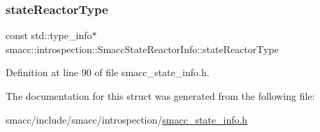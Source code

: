 \subsubsection{\texorpdfstring{state\+Reactor\+Type}{stateReactorType}}
{\footnotesize\ttfamily const std\+::type\+\_\+info$\ast$ smacc\+::introspection\+::\+Smacc\+State\+Reactor\+Info\+::state\+Reactor\+Type}



Definition at line 90 of file smacc\+\_\+state\+\_\+info.\+h.



The documentation for this struct was generated from the following file\+:\begin{DoxyCompactItemize}
\item 
smacc/include/smacc/introspection/\hyperlink{smacc__state__info_8h}{smacc\+\_\+state\+\_\+info.\+h}\end{DoxyCompactItemize}
